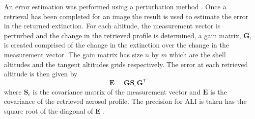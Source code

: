 \documentclass[12pt]{article}
\begin{document}
An error estimation was performed using a perturbation method \citep{Bourassa2012b}. Once a retrieval has been completed for an image the result is used to estimate the error in 
the returned extinction. For each altitude, the measurement vector is perturbed and the change in the retrieved profile is determined, a gain matrix, $\mathbf{G}$, is created 
comprised of the change in the extinction over the change in the measurement vector. The gain matrix has size $n$ by $m$ which are the shell altitudes and the tangent altitudes 
grids respectively. The error at each retrieved altitude is then given by
\begin{equation}
    \mathbf{E} = \mathbf{G}\mathbf{S}_{\epsilon}\mathbf{G}^{T}
\end{equation}
where $\mathbf{S}_{\epsilon}$ is the covariance matrix of the measurement vector and $\mathbf{E}$ is the covariance of the retrieved aerosol profile. The precision for ALI is 
taken has the square root of the diagonal of $\mathbf{E}$ \citep{Rodgers2000}.
\end{document}
